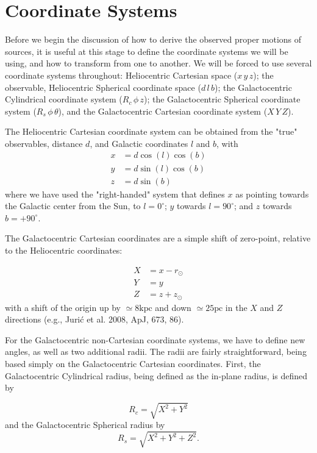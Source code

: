 \documentclass[fleqn,usenatbib]{mnras}
\begin{document}
\section{Coordinate Systems}
Before we begin the discussion of how to derive the observed proper motions of sources, it is useful at this stage to define the coordinate systems we will be using, and how to transform from one to another.
We will be forced to use several coordinate systems throughout: Heliocentric Cartesian space ($x\,y\,z$); the observable, Heliocentric Spherical coordinate space ($d\,l\,b$); the Galactocentric Cylindrical coordinate system ($R_c\,\phi\,z$); the Galactocentric Spherical coordinate system ($R_s\,\phi\,\theta$), and the Galactocentric Cartesian coordinate system ($X\,Y\,Z$).

The Heliocentric Cartesian coordinate system can be obtained from the "true" observables, distance $d$, and Galactic coordinates $l$ and $b$, with
\begin{align}
    x &= d \cos(l) \cos(b) \\
    y &= d \sin(l) \cos(b) \\
    z &= d \sin(b)
\end{align}
where we have used the "right-handed" system that defines $x$ as pointing towards the Galactic center from the Sun, to $l = 0^\circ$; $y$ towards $l = 90^\circ$; and $z$ towards $b = +90^\circ$.

The Galactocentric Cartesian coordinates are a simple shift of zero-point, relative to the Heliocentric coordinates:

\begin{align}
    X &= x - r_\odot \\
    Y & = y \\
    Z &= z + z_\odot
\end{align}
with a shift of the origin up by $\simeq 8 \mathrm{kpc}$ and down $\simeq 25 \mathrm{pc}$ in the $X$ and $Z$ directions (e.g., Juri\'{c} et al. 2008, ApJ, 673, 86).

For the Galactocentric non-Cartesian coordinate systems, we have to define new angles, as well as two additional radii.
The radii are fairly straightforward, being based simply on the Galactocentric Cartesian coordinates.
First, the Galactocentric Cylindrical radius, being defined as the in-plane radius, is defined by

\begin{equation}
    R_c = \sqrt{X^2 + Y^2}
\end{equation}
and the Galactocentric Spherical radius by
\begin{equation}
    R_s = \sqrt{X^2 + Y^2 + Z^2}.
\end{equation}
\end{document}
